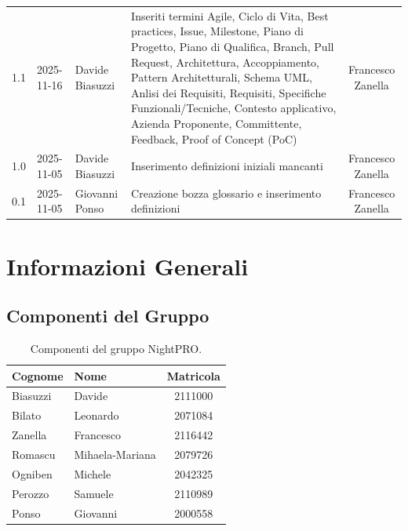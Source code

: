 \documentclass[a4paper, 11pt, oneside]{scrartcl} %
\begin{document}
\begin{center}
{\begin{tabular}{@{}llp{}p{}c@{}}
            1.1 & 2025-11-16 & Davide Biasuzzi & Inseriti termini Agile, Ciclo di Vita, Best practices, Issue, Milestone, Piano di Progetto, Piano di Qualifica, Branch, Pull Request, Architettura, Accoppiamento, Pattern Architetturali, Schema UML, Anlisi dei Requisiti, Requisiti, Specifiche Funzionali/Tecniche, Contesto applicativo, Azienda Proponente, Committente, Feedback, Proof of Concept (PoC) & Francesco Zanella \\
            1.0 & 2025-11-05 & Davide Biasuzzi & Inserimento definizioni iniziali mancanti & Francesco Zanella \\
            0.1 & 2025-11-05 & Giovanni Ponso & Creazione bozza glossario e inserimento definizioni & Francesco Zanella \\
            \bottomrule
        \end{tabular}
    }
\end{center}

\newpage
\tableofcontents %
\pagestyle{fancy}

\newpage
\section{Informazioni Generali}

\subsection{Componenti del Gruppo}

\begin{table}[h!]
    \centering
    \renewcommand{\arraystretch}{1.2} %
    \begin{tabular}{@{}llc@{}}
        \toprule
        \textbf{Cognome} & \textbf{Nome}   & \textbf{Matricola} \\
        \midrule
        Biasuzzi         & Davide          & 2111000            \\
        Bilato           & Leonardo        & 2071084            \\
        Zanella          & Francesco       & 2116442            \\
        Romascu          & Mihaela-Mariana & 2079726            \\
        Ogniben          & Michele         & 2042325            \\
        Perozzo          & Samuele         & 2110989            \\
        Ponso            & Giovanni        & 2000558            \\
        \bottomrule
    \end{tabular}
    \caption{Componenti del gruppo NightPRO.}
\end{table}
\end{document}
